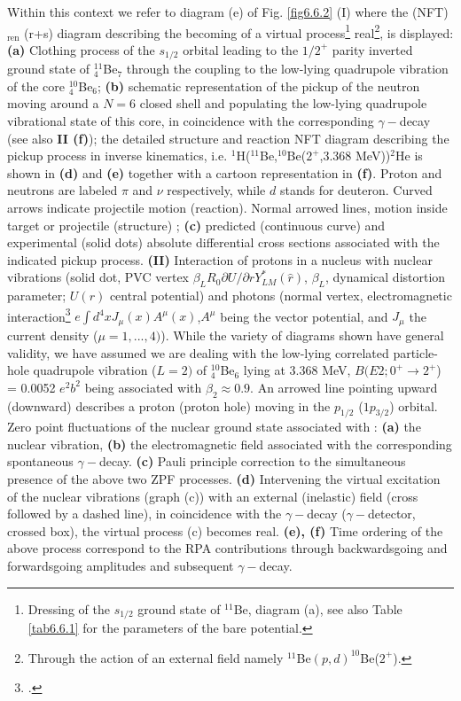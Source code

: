 Within this context we refer to diagram (e) of Fig. \ref{fig6.6.2} (I) where the (NFT)$_{\text{ren}}$ (r+s) diagram describing the becoming of a virtual process\footnote{Dressing of the $s_{1/2}$ ground state of $^{11}$Be, diagram (a), see also Table \ref{tab6.6.1} for the parameters of the bare potential.} real\footnote{Through the action of an external field namely $^{11}$Be$(p,d)^{10}$Be($2^+$).},  is displayed:  
{\bf (a)}  Clothing process of the $s_{1/2}$ orbital leading to the $1/2^+$ parity inverted ground state of $^{11}_4$Be$_{7}$
through the coupling to the low-lying quadrupole vibration of the core $^{10}_4$Be$_6$; 
{\bf (b)} schematic representation 
of the pickup of the neutron moving around a $N=6$ closed shell and populating the low-lying
quadrupole vibrational state of this core, in coincidence with the corresponding $\gamma-$decay 
(see also {\bf II (f)}); the detailed structure and reaction NFT diagram describing the pickup
process in inverse kinematics, i.e. $^1$H($^{11}$Be,$^{10}$Be($2^+$,3.368 MeV))$^2$He is 
shown in {\bf (d)} and  {\bf (e)} together with a cartoon representation in {\bf (f)}.
Proton 
and neutrons are labeled $\pi$ and $\nu$ respectively, while $d$ stands for deuteron.
Curved arrows indicate projectile motion (reaction). Normal arrowed 
lines, motion inside target or projectile (structure)
; {\bf (c)} predicted (continuous curve) and experimental
(solid dots) absolute differential cross sections     associated with the indicated  pickup process. 
{\bf (II)} Interaction of protons in a nucleus with nuclear vibrations (solid dot, PVC vertex 
$\beta_L R_0  \partial U/\partial r Y_{LM}^*(\hat r)$, $\beta_L$, dynamical
distortion parameter; $U(r)$ central potential) and photons (normal vertex, 
electromagnetic 
interaction\footnote{\cite{Holstein:89}.} $e \int d^4 x J_{\mu}(x) A^{\mu} (x)$,$A^{\mu}$ being 
the vector potential, and $J_{\mu}$ the current density ($\mu=1,...,4)$).
While the variety of diagrams shown have general validity, we have assumed
 we are dealing with the low-lying correlated particle-hole quadrupole vibration 
($L=2)$ of $^{10}_4$Be$_6$ lying at 3.368 MeV,  $B(E2; 0^+ \to 2^+$) = 0.0052 $e^2 b^2$ being
associated with $\beta_2 \approx 0.9$. An arrowed line pointing  upward (downward) 
describes a proton (proton hole) moving in the $p_{1/2}$ ($1p_{3/2}$) orbital. 
Zero point fluctuations of the nuclear ground state associated with : {\bf (a)} the nuclear
vibration, {\bf (b)} the electromagnetic field associated with the corresponding spontaneous
$\gamma-$decay.   {\bf (c)} Pauli principle correction to the simultaneous presence 
of the above two ZPF processes. {\bf (d)} Intervening the virtual excitation of the nuclear vibrations 
(graph (c)) with an external (inelastic) field  (cross followed by a dashed line), in coincidence with the $\gamma-$decay 
($\gamma-$detector, crossed box), the virtual process (c) becomes real. {\bf (e), (f)}  Time ordering of the 
above process correspond to the  RPA contributions through backwardsgoing and forwardsgoing amplitudes
and subsequent $\gamma-$decay.



